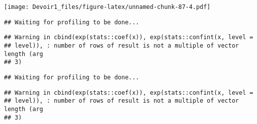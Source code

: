 \documentclass[]{article}
\newenvironment{Shaded}{\begin{snugshade}}{\end{snugshade}}
\newcommand{\KeywordTok}[1]{\textcolor[rgb]{0.13,0.29,0.53}{\textbf{#1}}}
\newcommand{\DataTypeTok}[1]{\textcolor[rgb]{0.13,0.29,0.53}{#1}}
\newcommand{\DecValTok}[1]{\textcolor[rgb]{0.00,0.00,0.81}{#1}}
\newcommand{\StringTok}[1]{\textcolor[rgb]{0.31,0.60,0.02}{#1}}
\newcommand{\OperatorTok}[1]{\textcolor[rgb]{0.81,0.36,0.00}{\textbf{#1}}}
\newcommand{\NormalTok}[1]{#1}
\begin{document}
\texttt{[image: Devoir1\_files/figure-latex/unnamed-chunk-87-4.pdf]}

\begin{Shaded}
\end{Shaded}

\begin{verbatim}
## Waiting for profiling to be done...
\end{verbatim}

\begin{verbatim}
## Warning in cbind(exp(stats::coef(x)), exp(stats::confint(x, level =
## level)), : number of rows of result is not a multiple of vector length (arg
## 3)
\end{verbatim}

\begin{verbatim}
## Waiting for profiling to be done...
\end{verbatim}

\begin{verbatim}
## Warning in cbind(exp(stats::coef(x)), exp(stats::confint(x, level =
## level)), : number of rows of result is not a multiple of vector length (arg
## 3)
\end{verbatim}
\end{document}
